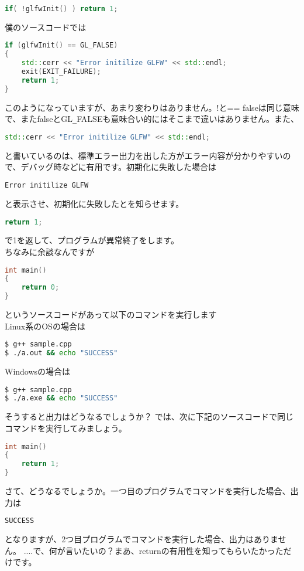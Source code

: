 \documentclass[a4paper,titlepage]{jsarticle}
\begin{document}
\begin{lstlisting}[language=C++]
if( !glfwInit() ) return 1;
\end{lstlisting}
僕のソースコードでは
\begin{lstlisting}[language=C++]
if (glfwInit() == GL_FALSE)
{
	std::cerr << "Error initilize GLFW" << std::endl;
	exit(EXIT_FAILURE);
	return 1;
}
\end{lstlisting}
このようになっていますが、あまり変わりはありません。!と== falseは同じ意味で、またfalseとGL\verb|_|FALSEも意味合い的にはそこまで違いはありません。また、
\begin{lstlisting}[language=C++]
std::cerr << "Error initilize GLFW" << std::endl;
\end{lstlisting}
と書いているのは、標準エラー出力を出した方がエラー内容が分かりやすいので、デバッグ時などに有用です。初期化に失敗した場合は
\begin{lstlisting}[language=bash]
Error initilize GLFW
\end{lstlisting}
と表示させ、初期化に失敗したとを知らせます。
\begin{lstlisting}[language=C++]
return 1;
\end{lstlisting}
で1を返して、プログラムが異常終了をします。\\
ちなみに余談なんですが
\newpage
\begin{lstlisting}[caption = sample.cpp,language = C++]
int main()
{
	return 0;
}
\end{lstlisting}
というソースコードがあって以下のコマンドを実行します\\Linux系のOSの場合は
\begin{lstlisting}[language=bash]
$ g++ sample.cpp
$ ./a.out && echo "SUCCESS"
\end{lstlisting}
Windowsの場合は
\begin{lstlisting}[language=bash]
$ g++ sample.cpp
$ ./a.exe && echo "SUCCESS"
\end{lstlisting}
そうすると出力はどうなるでしょうか？
では、次に下記のソースコードで同じコマンドを実行してみましょう。
\begin{lstlisting}[caption = sample.cpp,language = C++]
int main()
{
	return 1;
}
\end{lstlisting}
さて、どうなるでしょうか。一つ目のプログラムでコマンドを実行した場合、出力は
\begin{lstlisting}[language=bash]
SUCCESS
\end{lstlisting}
となりますが、2つ目プログラムでコマンドを実行した場合、出力はありません。
....で、何が言いたいの？まあ、returnの有用性を知ってもらいたかっただけです。
\end{document}
